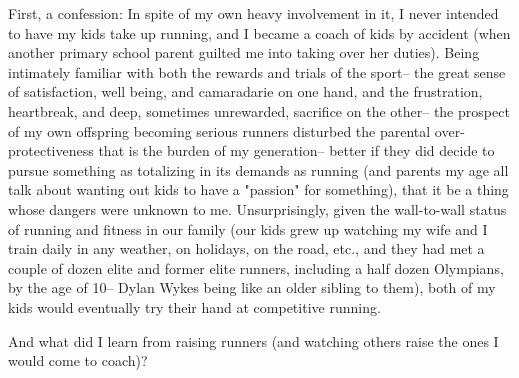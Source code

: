 First, a confession: In spite of my own heavy involvement in it, I never intended to have my kids take up running, and I became a coach of kids by accident (when another primary school parent guilted me into taking over her duties). Being intimately familiar with both the rewards and trials of the sport-- the great sense of satisfaction, well being, and camaradarie on one hand, and the frustration, heartbreak, and deep, sometimes unrewarded, sacrifice on the other-- the prospect of my own offspring becoming serious runners disturbed the parental over-protectiveness that is the burden of my generation-- better if they did decide to pursue something as totalizing in its demands as running (and parents my age all talk about wanting out kids to have a "passion" for something), that it be a thing whose dangers were unknown to me. Unsurprisingly, given the wall-to-wall status of running and fitness in our family (our kids grew up watching my wife and I train daily in any weather, on holidays, on the road, etc., and they had met a couple of dozen elite and former elite runners, including a half dozen Olympians, by the age of 10-- Dylan Wykes being like an older sibling to them), both of my kids would eventually try their hand at competitive running.

And what did I learn from raising runners (and watching others raise the ones I would come to coach)?

